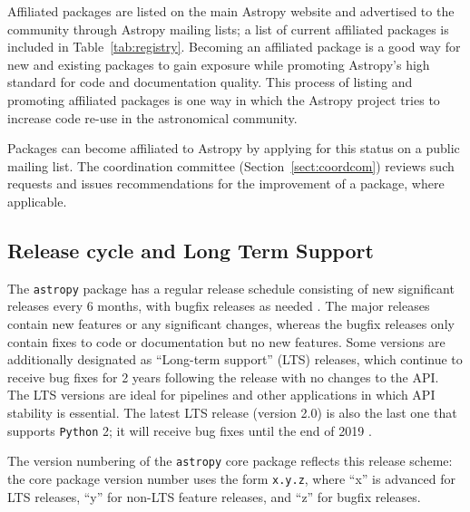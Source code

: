 \documentclass[modern]{aastex61}
\newcommand{\package}[1]{\texttt{#1}\xspace}
\newcommand{\python}{\package{Python}}
\newcommand{\astropy}{Astropy\xspace}
\newcommand{\astropypkg}{\package{astropy}}
\newcommand{\sectionname}{Section\xspace}
\renewcommand{\tablename}{Table\xspace}
\begin{document}
Affiliated packages are listed on the main \astropy website and advertised to
the community through \astropy mailing lists; a list of current affiliated
packages is included in \tablename~\ref{tab:registry}.
Becoming an affiliated package is a good way for new and existing packages to
gain exposure while promoting \astropy's high standard for code and
documentation quality.
This process of listing and promoting affiliated packages is one way in which
the \astropy project tries to increase code re-use in the astronomical
community.

Packages can become affiliated to \astropy by applying for this status on a public mailing list. The coordination committee (\sectionname~\ref{sect:coordcom}) reviews such requests and issues recommendations for the improvement of a package, where applicable.


\subsection{Release cycle and Long Term Support}
\label{sect:releasecycle}

The \astropypkg package has a regular release schedule consisting of new significant
releases every 6 months, with bugfix releases as needed \citep{ape2}.
The major releases contain new features or any significant changes, whereas
the bugfix releases only contain fixes to code or documentation but no new
features.
Some versions are additionally designated as ``Long-term support'' (LTS)
releases, which continue to receive bug fixes for 2 years following the release
with no changes to the API\@.
The LTS versions are ideal for pipelines and other applications in which API
stability is essential.
The latest LTS release (version 2.0) is also the last one that supports \python
2; it will receive bug fixes until the end of 2019 \citep{ape10}.

The version numbering of the \astropypkg core package reflects this release
scheme: the core package version number uses the form \texttt{x.y.z}, where ``x'' is
advanced for LTS releases, ``y'' for non-LTS feature releases, and
``z'' for bugfix releases.
\end{document}

